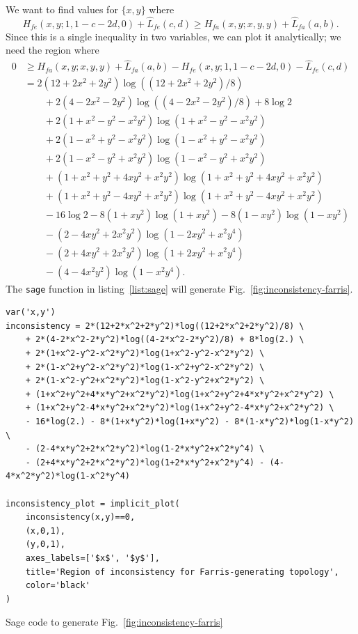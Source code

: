 \documentclass[a4paper]{article}
\begin{document}
We want to find values for $\{x,y\}$ where
$$
H_{fe}(x,y; 1, 1-c-2d, 0) + \hat{L}_{fe}(c,d) \ge H_{fa}(x,y; x, y, y) + \hat{L}_{fa}(a,b).
$$
Since this is a single inequality in two variables, we can plot it analytically; we need the region where
\begin{align*}
    0 &\ge H_{fa}(x,y; x, y, y) + \hat{L}_{fa}(a,b) - H_{fe}(x,y; 1, 1-c-2d, 0) - \hat{L}_{fe}(c,d) \\
      & = 2(12+2x^2+2y^2)\log((12+2x^2+2y^2)/8) \\
      &\qquad + 2(4-2x^2-2y^2)\log((4-2x^2-2y^2)/8)  + 8\log2 \\
      &\qquad + 2(1+x^2-y^2-x^2y^2)\log(1+x^2-y^2-x^2y^2) \\
      &\qquad + 2(1-x^2+y^2-x^2y^2)\log(1-x^2+y^2-x^2y^2) \\
      &\qquad + 2(1-x^2-y^2+x^2y^2)\log(1-x^2-y^2+x^2y^2) \\
      &\qquad + (1+x^2+y^2+4xy^2+x^2y^2)\log(1+x^2+y^2+4xy^2+x^2y^2) \\
      &\qquad + (1+x^2+y^2-4xy^2+x^2y^2)\log(1+x^2+y^2-4xy^2+x^2y^2) \\
      &\qquad - 16\log2 - 8(1+xy^2)\log(1+xy^2) - 8(1-xy^2)\log(1-xy^2) \\
      &\qquad - (2-4xy^2+2x^2y^2)\log(1-2xy^2+x^2y^4) \\
      &\qquad - (2+4xy^2+2x^2y^2)\log(1+2xy^2+x^2y^4) \\
      &\qquad - (4-4x^2y^2)\log(1-x^2y^4).
\end{align*}
The \texttt{sage} function in listing~\ref{list:sage} will generate Fig.~\ref{fig:inconsistency-farris}.

\begin{table}
    \begin{center}
\begin{verbatim}
var('x,y')
inconsistency = 2*(12+2*x^2+2*y^2)*log((12+2*x^2+2*y^2)/8) \
    + 2*(4-2*x^2-2*y^2)*log((4-2*x^2-2*y^2)/8) + 8*log(2.) \
    + 2*(1+x^2-y^2-x^2*y^2)*log(1+x^2-y^2-x^2*y^2) \
    + 2*(1-x^2+y^2-x^2*y^2)*log(1-x^2+y^2-x^2*y^2) \
    + 2*(1-x^2-y^2+x^2*y^2)*log(1-x^2-y^2+x^2*y^2) \
    + (1+x^2+y^2+4*x*y^2+x^2*y^2)*log(1+x^2+y^2+4*x*y^2+x^2*y^2) \
    + (1+x^2+y^2-4*x*y^2+x^2*y^2)*log(1+x^2+y^2-4*x*y^2+x^2*y^2) \
    - 16*log(2.) - 8*(1+x*y^2)*log(1+x*y^2) - 8*(1-x*y^2)*log(1-x*y^2) \
    - (2-4*x*y^2+2*x^2*y^2)*log(1-2*x*y^2+x^2*y^4) \
    - (2+4*x*y^2+2*x^2*y^2)*log(1+2*x*y^2+x^2*y^4) - (4-4*x^2*y^2)*log(1-x^2*y^4)

inconsistency_plot = implicit_plot(
    inconsistency(x,y)==0,
    (x,0,1),
    (y,0,1),
    axes_labels=['$x$', '$y$'],
    title='Region of inconsistency for Farris-generating topology',
    color='black'
)
\end{verbatim}
    \end{center}
\caption{Sage code to generate Fig.~\ref{fig:inconsistency-farris}}
\label{list:sage}
\end{table}
\end{document}
